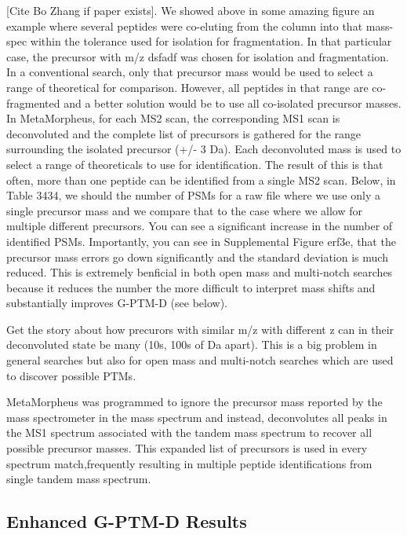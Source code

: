 \documentclass[journal=jprobs,manuscript=article]{achemso}
\begin{document}
[Cite Bo Zhang if paper exists].
We showed above in some amazing figure an example where several peptides were co-eluting from the column into that mass-spec within the tolerance used for isolation for fragmentation.
In that particular case, the precursor with m/z dsfadf was chosen for isolation and fragmentation.
In a conventional search, only that precursor mass would be used to select a range of theoretical for comparison.
However, all peptides in that range are co-fragmented and a better solution would be to use all co-isolated precursor masses.
In MetaMorpheus, for each MS2 scan, the corresponding MS1 scan is deconvoluted and the complete list of precursors is gathered for the range surrounding the isolated precursor (+/- 3 Da).
Each deconvoluted mass is used to select a range of theoreticals to use for identification.
The result of this is that often, more than one peptide can be identified from a single MS2 scan.
Below, in Table 3434, we should the number of PSMs for a raw file where we use only a single precursor mass and we compare that to the case where we allow for multiple different precursors.
You can see a significant increase in the number of identified PSMs.
Importantly, you can see in Supplemental Figure erf3e, that the precursor mass errors go down significantly and the standard deviation is much reduced.
This is extremely benficial in both open mass and multi-notch searches because it reduces the number the more difficult to interpret mass shifts and substantially improves G-PTM-D (see below).

Get the story about how precurors with similar m/z with different z can in their deconvoluted state be many (10s, 100s of Da apart).
This is a big problem in general searches but also for open mass and multi-notch searches which are used to discover possible PTMs. 

MetaMorpheus was programmed to ignore the precursor mass reported by the mass spectrometer in the mass spectrum and instead, deconvolutes all peaks in the MS1 spectrum associated with the tandem mass spectrum to recover all possible precursor masses.
This expanded list of precursors is used in every spectrum match,frequently resulting in multiple peptide identifications from single tandem mass spectrum.  

\subsection{Enhanced G-PTM-D Results}
\end{document}

